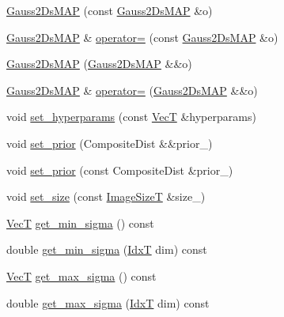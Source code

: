 \begin{DoxyCompactItemize}
\item 
\hyperlink{classmappel_1_1Gauss2DsMAP_accd31734a298dbd1582929aca3e4b73c}{Gauss2\+Ds\+M\+AP} (const \hyperlink{classmappel_1_1Gauss2DsMAP}{Gauss2\+Ds\+M\+AP} \&o)
\item 
\hyperlink{classmappel_1_1Gauss2DsMAP}{Gauss2\+Ds\+M\+AP} \& \hyperlink{classmappel_1_1Gauss2DsMAP_ae9a68cb6e29b130082f4e4cf93dfe734}{operator=} (const \hyperlink{classmappel_1_1Gauss2DsMAP}{Gauss2\+Ds\+M\+AP} \&o)
\item 
\hyperlink{classmappel_1_1Gauss2DsMAP_a9015cc6ed105fe404085efc74e79fb9c}{Gauss2\+Ds\+M\+AP} (\hyperlink{classmappel_1_1Gauss2DsMAP}{Gauss2\+Ds\+M\+AP} \&\&o)
\item 
\hyperlink{classmappel_1_1Gauss2DsMAP}{Gauss2\+Ds\+M\+AP} \& \hyperlink{classmappel_1_1Gauss2DsMAP_a617e62b1f0c440c86d0fe566c6e878e6}{operator=} (\hyperlink{classmappel_1_1Gauss2DsMAP}{Gauss2\+Ds\+M\+AP} \&\&o)
\item 
void \hyperlink{classmappel_1_1Gauss2DsModel_a615788e50f97d8c863ec60a5dfee07e3}{set\+\_\+hyperparams} (const \hyperlink{namespacemappel_a2225ad69f358daa3f4f99282a35b9a3a}{VecT} \&hyperparams)
\item 
void \hyperlink{classmappel_1_1Gauss2DsModel_a895bee95db23557189b58f9b1d5e2453}{set\+\_\+prior} (Composite\+Dist \&\&prior\+\_\+)
\item 
void \hyperlink{classmappel_1_1Gauss2DsModel_a440d1378a1b99f2b299a33644d894a57}{set\+\_\+prior} (const Composite\+Dist \&prior\+\_\+)
\item 
void \hyperlink{classmappel_1_1Gauss2DsModel_a4a95f8c149bd5881e01af5207e30e2e9}{set\+\_\+size} (const \hyperlink{classmappel_1_1ImageFormat2DBase_a49cccf61eb2a768a202634d27fcd81d5}{Image\+SizeT} \&size\+\_\+)
\item 
\hyperlink{namespacemappel_a2225ad69f358daa3f4f99282a35b9a3a}{VecT} \hyperlink{classmappel_1_1Gauss2DsModel_af93a5f984a97e23ae1d371c980e48a41}{get\+\_\+min\+\_\+sigma} () const 
\item 
double \hyperlink{classmappel_1_1Gauss2DsModel_abc315bd2db4fc654348a63aaaa1f3df2}{get\+\_\+min\+\_\+sigma} (\hyperlink{namespacemappel_ab17ec0f30b61ece292439d7ece81d3a8}{IdxT} dim) const 
\item 
\hyperlink{namespacemappel_a2225ad69f358daa3f4f99282a35b9a3a}{VecT} \hyperlink{classmappel_1_1Gauss2DsModel_a11f03c648095b6d7dd5c38c3a5eca2dc}{get\+\_\+max\+\_\+sigma} () const 
\item 
double \hyperlink{classmappel_1_1Gauss2DsModel_a66f4ff2b408413df0487bc18d11ca15c}{get\+\_\+max\+\_\+sigma} (\hyperlink{namespacemappel_ab17ec0f30b61ece292439d7ece81d3a8}{IdxT} dim) const 

\end{DoxyCompactItemize}
